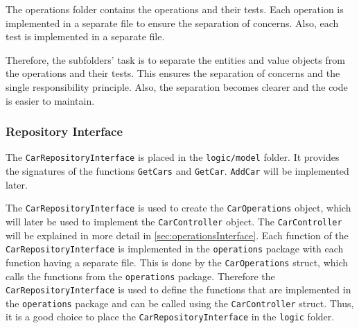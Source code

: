 The operations folder contains the operations and their tests.
Each operation is implemented in a separate file to ensure the separation of concerns.
Also, each test is implemented in a separate file.

Therefore, the subfolders' task is to separate the entities and value objects from the operations and their tests.
This ensures the separation of concerns and the single responsibility principle.
Also, the separation becomes clearer and the code is easier to maintain.

\subsubsection*{Repository Interface}
The \texttt{CarRepositoryInterface} is placed in the \texttt{logic/model} folder.
It provides the signatures of the functions \texttt{GetCars} and \texttt{GetCar}.
\texttt{AddCar} will be implemented later.

The \texttt{CarRepositoryInterface} is used to create the \texttt{CarOperations} object, which will later be used to implement the \texttt{CarController} object.
The \texttt{CarController} will be explained in more detail in \autoref*{sec:operationsInterface}.
Each function of the \texttt{CarRepositoryInterface} is implemented in the \texttt{operations} package with each function having a separate file.
This is done by the \texttt{CarOperations} struct, which calls the functions from the \texttt{operations} package.
Therefore the \texttt{CarRepositoryInterface} is used to define the functions that are implemented in the \texttt{operations} package and can be called using the \texttt{CarController} struct.
Thus, it is a good choice to place the \texttt{CarRepositoryInterface} in the \texttt{logic} folder.

